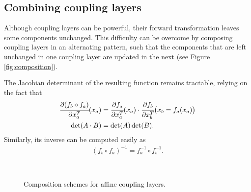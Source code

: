 \documentclass{article}
\newcommand{\jcom}[1]{\textcolor{darkgreen}{[jascha: #1]}}
\begin{document}
\subsection{Combining coupling layers}
Although coupling layers can be powerful, their forward transformation leaves some components unchanged.
This difficulty can be overcome by composing coupling layers in an alternating pattern, such that the components that are left unchanged in one coupling layer are updated in the next (see Figure \ref{fig:composition}).

The Jacobian determinant of the resulting function remains tractable, relying on the fact that
\begin{align}
\cfrac{\partial (f_{b} \circ f_{a})}{\partial x_{a}^{T}}(x_{a}) &= \cfrac{\partial f_{a}}{\partial x_{a}^{T}}(x_{a}) \cdot \cfrac{\partial f_{b}}{\partial x_{b}^{T}}\big(x_{b}=f_{a}(x_{a})\big) \\
\det(A \cdot B) &= \det(A) \det(B).
\end{align}
Similarly, its inverse can be computed easily as
\begin{align}
(f_{b} \circ f_{a})^{-1} = f_{a}^{-1} \circ f_{b}^{-1}.
\end{align}
\begin{figure}[h]
    \centering {} ~~~~~~
    \caption{Composition schemes for affine coupling layers.}
\end{figure}
\end{document}
